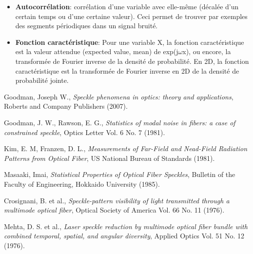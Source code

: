 \documentclass{article}       %
\begin{document}
\begin{itemize}
    \bigskip
    
    \item\textbf{Autocorrélation}: corrélation d'une variable avec elle-même (décalée d'un certain temps ou d'une certaine valeur). Ceci permet de trouver par exemples des segments périodiques dans un signal bruité.\\
    
    \item\textbf{Fonction caractéristique}: Pour une variable X, la fonction caractéristique est la valeur attendue (expected value, mean) de exp(j$\omega$x), ou encore, la transformée de Fourier inverse de la densité de probabilité. En 2D, la fonction caractéristique est la transformée de Fourier inverse en 2D de la densité de probabilité jointe.
    
    
    
\end{itemize}
\newpage


\begin{thebibliography}{9}

 Goodman, Joseph W., \emph{Speckle phenomena in optics: theory and applications}, Roberts and Company Publishers (2007).

 Goodman, J. W., Rawson, E. G., \emph{Statistics of modal noise in fibers: a case of constrained speckle}, Optics Letter Vol. 6 No. 7 (1981).

 Kim, E. M, Franzen, D. L., \emph{Measurements of Far-Field and Nead-Field Radiation Patterns from Optical Fiber}, US National Bureau of Standards (1981).

 Masaaki, Imai, \emph{Statistical Properties of Optical Fiber Speckles}, Bulletin of the Faculty of Engineering, Hokkaido University (1985).

 Crosignani, B. et al., \emph{Speckle-pattern visibility of light transmitted through a multimode optical fiber}, Optical Society of America Vol. 66 No. 11 (1976).

 Mehta, D. S. et al., \emph{Laser speckle reduction by multimode optical
fiber bundle with combined temporal,
spatial, and angular diversity},  Applied Optics Vol. 51 No. 12 (1976).

\end{thebibliography}
\end{document}
